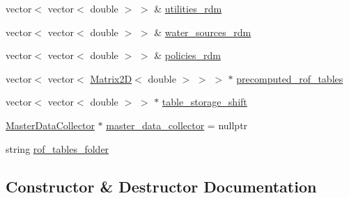 \begin{DoxyCompactItemize}
vector$<$ vector$<$ double $>$ $>$ \& \mbox{\hyperlink{classSimulation_a0e0766513f36e2e95e83b0611c3c078c_a0e0766513f36e2e95e83b0611c3c078c}{utilities\+\_\+rdm}}
\item 
vector$<$ vector$<$ double $>$ $>$ \& \mbox{\hyperlink{classSimulation_afd35d5f1a11036d7c64668274ba0cc20_afd35d5f1a11036d7c64668274ba0cc20}{water\+\_\+sources\+\_\+rdm}}
\item 
vector$<$ vector$<$ double $>$ $>$ \& \mbox{\hyperlink{classSimulation_a4fd8d11506b6427577c9d8aa43932b2c_a4fd8d11506b6427577c9d8aa43932b2c}{policies\+\_\+rdm}}
\item 
vector$<$ vector$<$ \mbox{\hyperlink{classMatrix2D}{Matrix2D}}$<$ double $>$ $>$ $>$ $\ast$ \mbox{\hyperlink{classSimulation_a7fc97bea88fee3f551d22042ae813428_a7fc97bea88fee3f551d22042ae813428}{precomputed\+\_\+rof\+\_\+tables}}
\item 
vector$<$ vector$<$ double $>$ $>$ $\ast$ \mbox{\hyperlink{classSimulation_a024cbe4c66a4329c5f12009434b8bdc2_a024cbe4c66a4329c5f12009434b8bdc2}{table\+\_\+storage\+\_\+shift}}
\item 
\mbox{\hyperlink{classMasterDataCollector}{Master\+Data\+Collector}} $\ast$ \mbox{\hyperlink{classSimulation_a9c69464c2674176a43d1d48bee9fad50_a9c69464c2674176a43d1d48bee9fad50}{master\+\_\+data\+\_\+collector}} = nullptr
\item 
string \mbox{\hyperlink{classSimulation_aca810eb7785417158d897dfdf366e9fa_aca810eb7785417158d897dfdf366e9fa}{rof\+\_\+tables\+\_\+folder}}
\end{DoxyCompactItemize}


\subsection{Constructor \& Destructor Documentation}
\mbox{\label{classSimulation_ac9b9db9c3de5f9ff33f6ea89e2435c87_ac9b9db9c3de5f9ff33f6ea89e2435c87}} 
